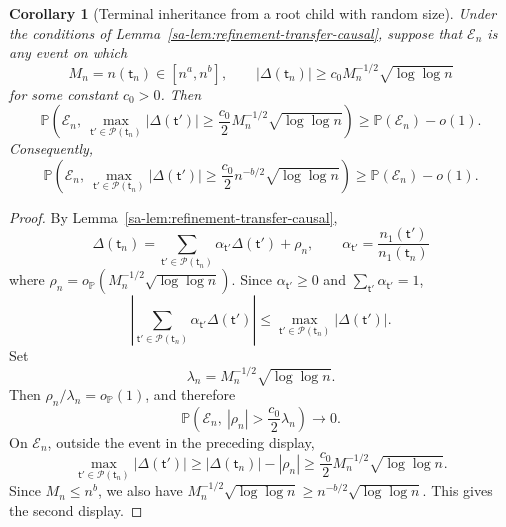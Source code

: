\documentclass[10pt]{article}
\def\nodet{\mathsf{t}}
\def\P{\mathbb{P}}
\newtheorem{coro}[theorem]{Corollary}
\theoremstyle{definition}
\theoremstyle{remark}
\begin{document}
\begin{coro}[Terminal inheritance from a root child with random size]\label{sa-coro:terminal-inheritance-arm-transfer}
Under the conditions of Lemma~\ref{sa-lem:refinement-transfer-causal}, suppose that $\mathcal E_n$ is any event on which
\[
    M_n=n(\nodet_n)\in[n^a,n^b],
    \qquad
    |\Delta(\nodet_n)|
    \geq
    c_0M_n^{-1/2}\sqrt{\log\log n}
\]
for some constant $c_0>0$. Then
\[
    \P\left(
        \mathcal E_n,\
        \max_{\nodet'\in\mathcal P(\nodet_n)}
        |\Delta(\nodet')|
        \geq
        \frac{c_0}{2}M_n^{-1/2}\sqrt{\log\log n}
    \right)
    \geq
    \P(\mathcal E_n)-o(1).
\]
Consequently,
\[
    \P\left(
        \mathcal E_n,\
        \max_{\nodet'\in\mathcal P(\nodet_n)}
        |\Delta(\nodet')|
        \geq
        \frac{c_0}{2}n^{-b/2}\sqrt{\log\log n}
    \right)
    \geq
    \P(\mathcal E_n)-o(1).
\]
\end{coro}

\begin{proof}
By Lemma~\ref{sa-lem:refinement-transfer-causal},
\[
    \Delta(\nodet_n)
    =
    \sum_{\nodet'\in\mathcal P(\nodet_n)}
    \alpha_{\nodet'}\Delta(\nodet')
    +
    \rho_n,
    \qquad
    \alpha_{\nodet'}=\frac{n_1(\nodet')}{n_1(\nodet_n)}
\]
where $\rho_n=o_\P(M_n^{-1/2}\sqrt{\log\log n})$.
Since $\alpha_{\nodet'}\geq0$ and $\sum_{\nodet'}\alpha_{\nodet'}=1$,
\[
    \left|
        \sum_{\nodet'\in\mathcal P(\nodet_n)}
        \alpha_{\nodet'}\Delta(\nodet')
    \right|
    \leq
    \max_{\nodet'\in\mathcal P(\nodet_n)}
    |\Delta(\nodet')|.
\]
Set
\[
    \lambda_n=M_n^{-1/2}\sqrt{\log\log n}.
\]
Then $\rho_n/\lambda_n=o_\P(1)$, and therefore
\[
    \P\left(
        \mathcal E_n,\
        |\rho_n|>\frac{c_0}{2}\lambda_n
    \right)
    \to0.
\]
On $\mathcal E_n$, outside the event in the preceding display,
\[
    \max_{\nodet'\in\mathcal P(\nodet_n)}
    |\Delta(\nodet')|
    \geq
    |\Delta(\nodet_n)|
    -
    |\rho_n|
    \geq
    \frac{c_0}{2}M_n^{-1/2}\sqrt{\log\log n}.
\]
Since $M_n\leq n^b$, we also have
$M_n^{-1/2}\sqrt{\log\log n}\geq n^{-b/2}\sqrt{\log\log n}$. This gives the second display.
\end{proof}
\end{document}
